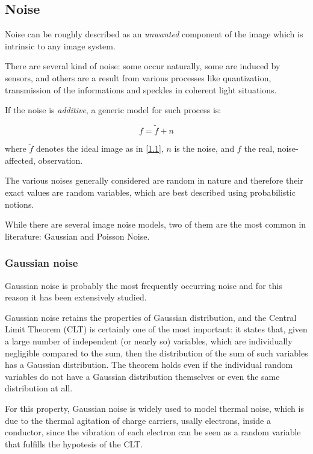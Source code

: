 \subsection{Noise}

Noise can be roughly described as an \emph{unwanted} component of the image which is intrinsic to any image system.

There are several kind of noise: some occur naturally, some are induced by sensors, and others are a result from various processes like quantization, transmission of the informations and speckles in coherent light situations.

If the noise is \emph{additive}, a generic model for such process is:

$$f = \tilde{f} + n$$

where $\tilde{f}$ denotes the ideal image as in \eqref{1.1}, $n$ is the noise, and $f$ the real, noise-affected, observation.

The various noises generally considered are random in nature and therefore their exact values are random variables, which are best described using probabilistic notions.

While there are several image noise models, two of them are the most common in literature: Gaussian and Poisson Noise.

\subsubsection{Gaussian noise}

Gaussian noise is probably the most frequently occurring noise and for this reason it has been extensively studied.

Gaussian noise retains the properties of Gaussian distribution, and the Central Limit Theorem (CLT) is certainly one of the most important: it states that, given a large number of independent (or nearly so) variables, which are individually negligible compared to the sum, then the distribution of the sum of such variables has a Gaussian distribution. The theorem holds even if the individual random variables do not have a Gaussian distribution themselves or even the same distribution at all.

For this property, Gaussian noise is widely used to model thermal noise, which is due to the thermal agitation of charge carriers, usally electrons, inside a conductor, since the vibration of each electron can be seen as a random variable that fulfills the hypotesis of the CLT.

